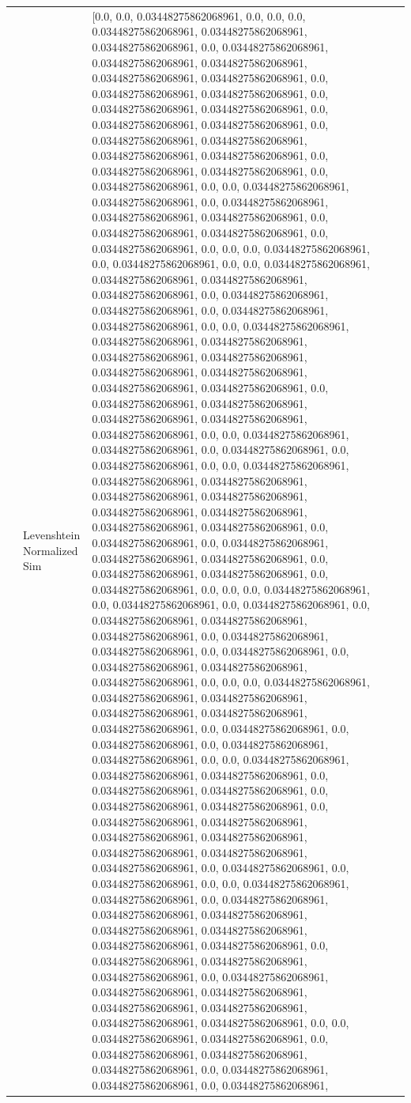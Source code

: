 \begin{tabular}{llll}
 & Levenshtein Normalized Sim & [0.0, 0.0, 0.03448275862068961, 0.0, 0.0, 0.0, 0.03448275862068961, 0.03448275862068961, 0.03448275862068961, 0.0, 0.03448275862068961, 0.03448275862068961, 0.03448275862068961, 0.03448275862068961, 0.03448275862068961, 0.0, 0.03448275862068961, 0.03448275862068961, 0.0, 0.03448275862068961, 0.03448275862068961, 0.0, 0.03448275862068961, 0.03448275862068961, 0.0, 0.03448275862068961, 0.03448275862068961, 0.03448275862068961, 0.03448275862068961, 0.0, 0.03448275862068961, 0.03448275862068961, 0.0, 0.03448275862068961, 0.0, 0.0, 0.03448275862068961, 0.03448275862068961, 0.0, 0.03448275862068961, 0.03448275862068961, 0.03448275862068961, 0.0, 0.03448275862068961, 0.03448275862068961, 0.0, 0.03448275862068961, 0.0, 0.0, 0.0, 0.03448275862068961, 0.0, 0.03448275862068961, 0.0, 0.0, 0.03448275862068961, 0.03448275862068961, 0.03448275862068961, 0.03448275862068961, 0.0, 0.03448275862068961, 0.03448275862068961, 0.0, 0.03448275862068961, 0.03448275862068961, 0.0, 0.0, 0.03448275862068961, 0.03448275862068961, 0.03448275862068961, 0.03448275862068961, 0.03448275862068961, 0.03448275862068961, 0.03448275862068961, 0.03448275862068961, 0.03448275862068961, 0.0, 0.03448275862068961, 0.03448275862068961, 0.03448275862068961, 0.03448275862068961, 0.03448275862068961, 0.0, 0.0, 0.03448275862068961, 0.03448275862068961, 0.0, 0.03448275862068961, 0.0, 0.03448275862068961, 0.0, 0.0, 0.03448275862068961, 0.03448275862068961, 0.03448275862068961, 0.03448275862068961, 0.03448275862068961, 0.03448275862068961, 0.03448275862068961, 0.03448275862068961, 0.03448275862068961, 0.0, 0.03448275862068961, 0.0, 0.03448275862068961, 0.03448275862068961, 0.03448275862068961, 0.0, 0.03448275862068961, 0.03448275862068961, 0.0, 0.03448275862068961, 0.0, 0.0, 0.0, 0.03448275862068961, 0.0, 0.03448275862068961, 0.0, 0.03448275862068961, 0.0, 0.03448275862068961, 0.03448275862068961, 0.03448275862068961, 0.0, 0.03448275862068961, 0.03448275862068961, 0.0, 0.03448275862068961, 0.0, 0.03448275862068961, 0.03448275862068961, 0.03448275862068961, 0.0, 0.0, 0.0, 0.03448275862068961, 0.03448275862068961, 0.03448275862068961, 0.03448275862068961, 0.03448275862068961, 0.03448275862068961, 0.0, 0.03448275862068961, 0.0, 0.03448275862068961, 0.0, 0.03448275862068961, 0.03448275862068961, 0.0, 0.0, 0.03448275862068961, 0.03448275862068961, 0.03448275862068961, 0.0, 0.03448275862068961, 0.03448275862068961, 0.0, 0.03448275862068961, 0.03448275862068961, 0.0, 0.03448275862068961, 0.03448275862068961, 0.03448275862068961, 0.03448275862068961, 0.03448275862068961, 0.03448275862068961, 0.03448275862068961, 0.0, 0.03448275862068961, 0.0, 0.03448275862068961, 0.0, 0.0, 0.03448275862068961, 0.03448275862068961, 0.0, 0.03448275862068961, 0.03448275862068961, 0.03448275862068961, 0.03448275862068961, 0.03448275862068961, 0.03448275862068961, 0.03448275862068961, 0.0, 0.03448275862068961, 0.03448275862068961, 0.03448275862068961, 0.0, 0.03448275862068961, 0.03448275862068961, 0.03448275862068961, 0.03448275862068961, 0.03448275862068961, 0.03448275862068961, 0.03448275862068961, 0.0, 0.0, 0.03448275862068961, 0.03448275862068961, 0.0, 0.03448275862068961, 0.03448275862068961, 0.03448275862068961, 0.0, 0.03448275862068961, 0.03448275862068961, 0.0, 0.03448275862068961, 
\end{tabular}
